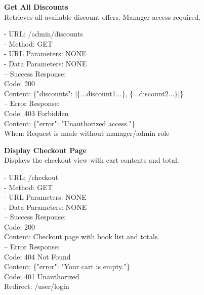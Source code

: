 \begin{flushleft}
    \textbf{Get All Discounts} \\
    Retrieves all available discount offers. Manager access required.

    - URL: /admin/discounts \\
    - Method: GET \\
    - URL Parameters: NONE \\
    - Data Parameters: NONE \\
    – Success Response: \\
    Code: 200 \\
    Content: \{"discounts": [\{...discount1...\}, \{...discount2...\}]\} \\
    – Error Response: \\
    Code: 403 Forbidden \\
    Content: \{"error": "Unauthorized access."\} \\
    When: Request is made without manager/admin role
\end{flushleft}

\begin{flushleft}
    \textbf{Display Checkout Page} \\
    Displays the checkout view with cart contents and total.

    - URL: /checkout \\
    - Method: GET \\
    - URL Parameters: NONE \\
    - Data Parameters: NONE \\
    – Success Response: \\
    Code: 200 \\
    Content: Checkout page with book list and totals. \\
    – Error Response: \\
    Code: 404 Not Found \\
    Content: \{"error": "Your cart is empty."\} \\
    Code: 401 Unauthorized \\
    Redirect: /user/login
\end{flushleft}

